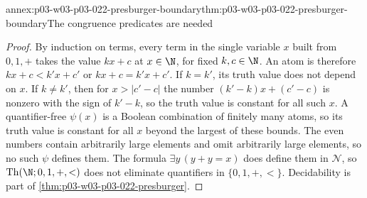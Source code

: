 \begin{annexitem}{annex:p03-w03-p03-022-presburger-boundary}{thm:p03-w03-p03-022-presburger-boundary}{The congruence predicates are needed}
\begin{proof}
By induction on terms, every term in the single variable \(x\) built from
\(0,1,+\) takes the value \(kx+c\) at \(x\in\N\), for fixed
\(k,c\in\N\). An atom is therefore \(kx+c<k'x+c'\) or \(kx+c=k'x+c'\). If
\(k=k'\), its truth value does not depend on \(x\). If \(k\ne k'\), then for
\(x>|c'-c|\) the number \((k'-k)x+(c'-c)\) is nonzero with the sign of
\(k'-k\), so the truth value is constant for all such \(x\). A
quantifier-free \(\psi(x)\) is a Boolean combination of finitely many atoms,
so its truth value is constant for all \(x\) beyond the largest of these
bounds. The even numbers contain arbitrarily large elements and omit
arbitrarily large elements, so no such \(\psi\) defines them. The formula
\(\exists y\,(y+y=x)\) does define them in \(\mathcal N\), so
\(\operatorname{Th}(\N;0,1,+,<)\) does not eliminate quantifiers in
\(\{0,1,+,<\}\). Decidability is part of
\cref{thm:p03-w03-p03-022-presburger}.
\end{proof}
\end{annexitem}

